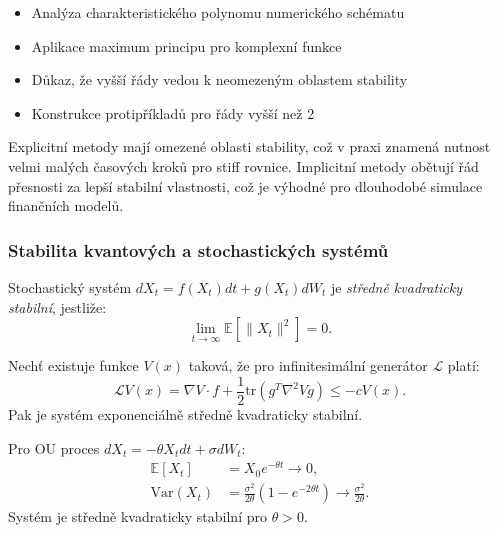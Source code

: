 \begin{proofsketch}
\begin{itemize}
\item Analýza charakteristického polynomu numerického schématu
\item Aplikace maximum principu pro komplexní funkce
\item Důkaz, že vyšší řády vedou k neomezeným oblastem stability
\item Konstrukce protipříkladů pro řády vyšší než 2
\end{itemize}
\end{proofsketch}

\begin{intuition}
Explicitní metody mají omezené oblasti stability, což v praxi znamená nutnost velmi malých časových kroků pro stiff rovnice. Implicitní metody obětují řád přesnosti za lepší stabilní vlastnosti, což je výhodné pro dlouhodobé simulace finančních modelů.
\end{intuition}

\subsubsection{Stabilita kvantových a stochastických systémů}

\begin{definition}
Stochastický systém $dX_t = f(X_t)dt + g(X_t)dW_t$ je \emph{středně kvadraticky stabilní}, jestliže:
\[
\lim_{t \to \infty} \mathbb{E}[\|X_t\|^2] = 0.
\]
\end{definition}

\begin{theorem}
Nechť existuje funkce $V(x)$ taková, že pro infinitesimální generátor $\mathcal{L}$ platí:
\[
\mathcal{L}V(x) = \nabla V \cdot f + \frac{1}{2}\mathrm{tr}(g^T \nabla^2 V g) \leq -cV(x).
\]
Pak je systém exponenciálně středně kvadraticky stabilní.
\end{theorem}

\begin{example}
Pro OU proces $dX_t = -\theta X_t dt + \sigma dW_t$:
\begin{align*}
\mathbb{E}[X_t] &= X_0 e^{-\theta t} \to 0, \\
\mathrm{Var}(X_t) &= \frac{\sigma^2}{2\theta}(1 - e^{-2\theta t}) \to \frac{\sigma^2}{2\theta}.
\end{align*}
Systém je středně kvadraticky stabilní pro $\theta > 0$.
\end{example}



